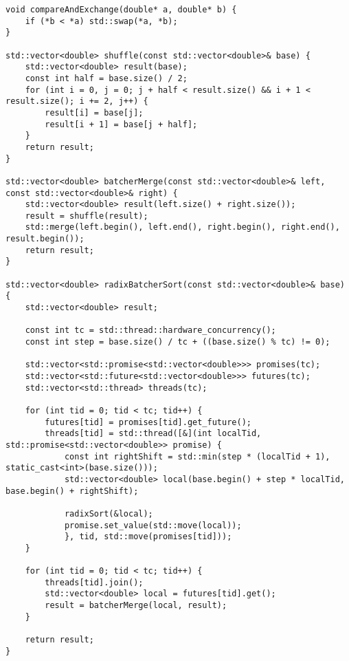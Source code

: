 \documentclass[12pt,a4paper]{article}
\begin{document}
\begin{lstlisting}
void compareAndExchange(double* a, double* b) {
    if (*b < *a) std::swap(*a, *b);
}

std::vector<double> shuffle(const std::vector<double>& base) {
    std::vector<double> result(base);
    const int half = base.size() / 2;
    for (int i = 0, j = 0; j + half < result.size() && i + 1 < result.size(); i += 2, j++) {
        result[i] = base[j];
        result[i + 1] = base[j + half];
    }
    return result;
}

std::vector<double> batcherMerge(const std::vector<double>& left, const std::vector<double>& right) {
    std::vector<double> result(left.size() + right.size());
    result = shuffle(result);
    std::merge(left.begin(), left.end(), right.begin(), right.end(), result.begin());
    return result;
}

std::vector<double> radixBatcherSort(const std::vector<double>& base) {
    std::vector<double> result;

    const int tc = std::thread::hardware_concurrency();
    const int step = base.size() / tc + ((base.size() % tc) != 0);

    std::vector<std::promise<std::vector<double>>> promises(tc);
    std::vector<std::future<std::vector<double>>> futures(tc);
    std::vector<std::thread> threads(tc);

    for (int tid = 0; tid < tc; tid++) {
        futures[tid] = promises[tid].get_future();
        threads[tid] = std::thread([&](int localTid, std::promise<std::vector<double>> promise) {
            const int rightShift = std::min(step * (localTid + 1), static_cast<int>(base.size()));
            std::vector<double> local(base.begin() + step * localTid, base.begin() + rightShift);

            radixSort(&local);
            promise.set_value(std::move(local));
            }, tid, std::move(promises[tid]));
    }

    for (int tid = 0; tid < tc; tid++) {
        threads[tid].join();
        std::vector<double> local = futures[tid].get();
        result = batcherMerge(local, result);
    }

    return result;
}
\end{lstlisting}
\end{document}
